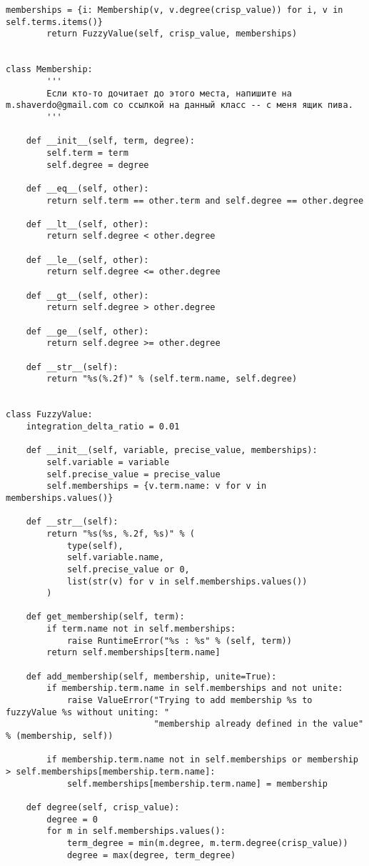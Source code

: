 \begin{lstlisting}[style=pythonstyle,caption={ }, label=lst:func:1]
		memberships = {i: Membership(v, v.degree(crisp_value)) for i, v in self.terms.items()}
		return FuzzyValue(self, crisp_value, memberships)


class Membership:
        '''
        Если кто-то дочитает до этого места, напишите на m.shaverdo@gmail.com со ссылкой на данный класс -- с меня ящик пива.
        '''

	def __init__(self, term, degree):
		self.term = term
		self.degree = degree

	def __eq__(self, other):
		return self.term == other.term and self.degree == other.degree

	def __lt__(self, other):
		return self.degree < other.degree

	def __le__(self, other):
		return self.degree <= other.degree

	def __gt__(self, other):
		return self.degree > other.degree

	def __ge__(self, other):
		return self.degree >= other.degree

	def __str__(self):
		return "%s(%.2f)" % (self.term.name, self.degree)


class FuzzyValue:
	integration_delta_ratio = 0.01

	def __init__(self, variable, precise_value, memberships):
		self.variable = variable
		self.precise_value = precise_value
		self.memberships = {v.term.name: v for v in memberships.values()}

	def __str__(self):
		return "%s(%s, %.2f, %s)" % (
			type(self),
			self.variable.name,
			self.precise_value or 0,
			list(str(v) for v in self.memberships.values())
		)

	def get_membership(self, term):
		if term.name not in self.memberships:
			raise RuntimeError("%s : %s" % (self, term))
		return self.memberships[term.name]

	def add_membership(self, membership, unite=True):
		if membership.term.name in self.memberships and not unite:
			raise ValueError("Trying to add membership %s to fuzzyValue %s without uniting: "
							 "membership already defined in the value" % (membership, self))

		if membership.term.name not in self.memberships or membership > self.memberships[membership.term.name]:
			self.memberships[membership.term.name] = membership

	def degree(self, crisp_value):
		degree = 0
		for m in self.memberships.values():
			term_degree = min(m.degree, m.term.degree(crisp_value))
			degree = max(degree, term_degree)


\end{lstlisting}
